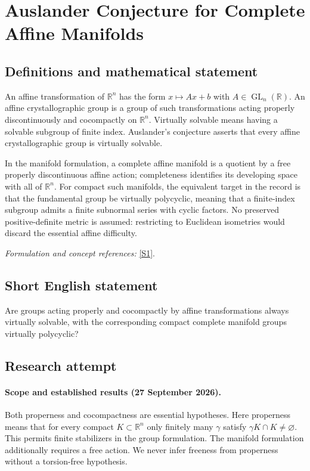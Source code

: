 \documentclass[11pt]{article}
\begin{document}
\section*{\texorpdfstring{Auslander Conjecture for Complete Affine Manifolds}{Auslander Conjecture for Complete Affine Manifolds}}\label{30002369}
\subsection{Definitions and mathematical statement}
An affine transformation of ${\mathbb{R}}^n$ has the form $x\mapsto Ax+b$ with $A\in\operatorname{GL}_n({\mathbb{R}})$. An affine crystallographic group is a group of such transformations acting properly discontinuously and cocompactly on ${\mathbb{R}}^n$. Virtually solvable means having a solvable subgroup of finite index. Auslander's conjecture asserts that every affine crystallographic group is virtually solvable.

In the manifold formulation, a complete affine manifold is a quotient by a free properly discontinuous affine action; completeness identifies its developing space with all of ${\mathbb{R}}^n$. For compact such manifolds, the equivalent target in the record is that the fundamental group be virtually polycyclic, meaning that a finite-index subgroup admits a finite subnormal series with cyclic factors. No preserved positive-definite metric is assumed: restricting to Euclidean isometries would discard the essential affine difficulty.
\par\smallskip\textit{Formulation and concept references:} \href{https://www.math.umd.edu/~wmg/gstom.pdf}{[S1]}.

\subsection{Short English statement}
Are groups acting properly and cocompactly by affine transformations always virtually solvable, with the corresponding compact complete manifold groups virtually polycyclic?
\subsection{Research attempt}

\paragraph{Scope and established results (27 September 2026).}
Both properness and cocompactness are essential hypotheses. Here
properness means that for every compact $K\subset\mathbb R^n$ only
finitely many $\gamma$ satisfy $\gamma K\cap K\ne\varnothing$.
This permits finite stabilizers in the group formulation. The manifold
formulation additionally requires a free action. We never infer
freeness from properness without a torsion-free hypothesis.
\end{document}
